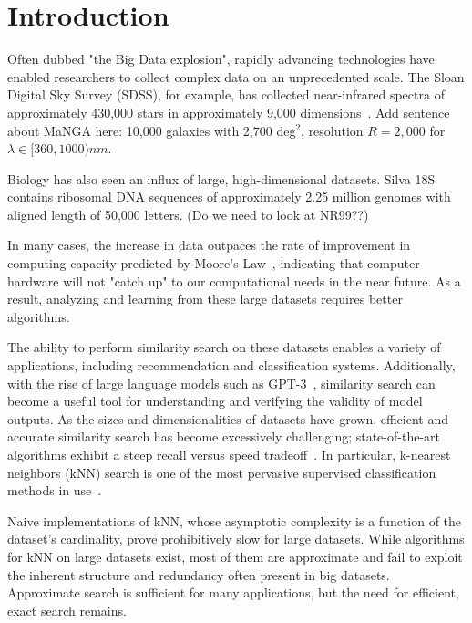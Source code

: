 \section{Introduction}
\label{sec:introduction}
Often dubbed "the Big Data explosion", rapidly advancing technologies have enabled researchers to collect complex data on an unprecedented scale. 
The Sloan Digital Sky Survey (SDSS), for example, has collected near-infrared spectra of approximately 430,000 stars in approximately 9,000 dimensions~\cite{alam2015eleventh}. 
Add sentence about MaNGA here: 10,000 galaxies with 2,700 deg$^2$, resolution $R=2,000$ for $\lambda \in [360, 1000) nm$.

Biology has also seen an influx of large, high-dimensional datasets. Silva 18S contains ribosomal DNA sequences of approximately 2.25 
million genomes with aligned length of 50,000 letters. (Do we need to look at NR99??) 

In many cases, the increase in data outpaces the rate of improvement in computing capacity predicted by Moore's Law~\cite{moore1965cramming}, indicating 
that computer hardware will not "catch up" to our computational needs in the near future. As a result, analyzing and learning from these large datasets 
requires better algorithms. 

The ability to perform similarity search on these datasets enables a variety of applications, including recommendation and classification systems. 
Additionally, with the rise of large language models such as GPT-3~\cite{brown2020language}, similarity search can become a useful tool for 
understanding and verifying the validity of model outputs. 
As the sizes and dimensionalities of datasets have grown, efficient and accurate similarity search has become excessively challenging; 
state-of-the-art algorithms exhibit a steep recall versus speed tradeoff~\cite{ishaq2019clustered}.
In particular, k-nearest neighbors (kNN) search is one of the most pervasive supervised classification methods in use~\cite{fix1952discriminatory, cover1967nearest}.

Naive implementations of kNN, whose asymptotic complexity is a function of the dataset's cardinality, 
prove prohibitively slow for large datasets. While algorithms for kNN on large datasets exist, most of them are approximate and fail to 
exploit the inherent structure and redundancy often present in big datasets. Approximate search is sufficient for many applications, but the 
need for efficient, exact search remains.

